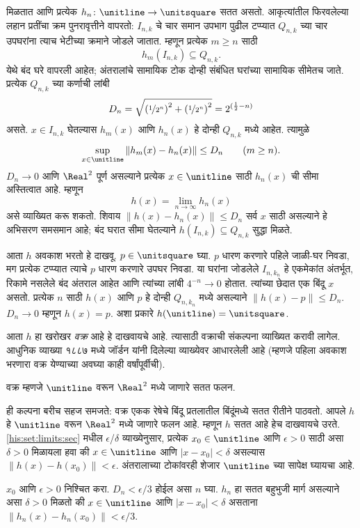 मिळतात आणि प्रत्येक $h_n\colon\unitline\to\unitsquare$
सतत असतो.
आकृत्यांतील फिरवलेल्या लहान प्रतींचा क्रम पुनरावृत्तीने
वापरतो: $I_{n,k}$ चे चार समान उपभाग पुढील टप्प्यात
$Q_{n,k}$ च्या चार उपघरांना त्याच भेटीच्या क्रमाने
जोडले जातात. म्हणून प्रत्येक $m\geq n$ साठी
\[
h_m(I_{n,k})\subseteq Q_{n,k}.
\]
येथे बंद घरे वापरली आहेत; अंतरालांचे सामायिक टोक दोन्ही
संबंधित घरांच्या सामायिक सीमेतच जाते.
प्रत्येक $Q_{n,k}$ च्या कर्णाची लांबी
\[
D_n=\sqrt{\left(\nicefrac{1}{2^{n}}\right)^2+
\left(\nicefrac{1}{2^{n}}\right)^2}
=2^{(\frac{1}{2}-n)}
\]
असते. $x\in I_{n,k}$ घेतल्यास $h_m(x)$ आणि $h_n(x)$
हे दोन्ही $Q_{n,k}$ मध्ये आहेत. त्यामुळे
\[
\sup_{x\in\unitline}\|h_m(x)-h_n(x)\|\leq D_n
\qquad(m\geq n).
\]
$D_n\to0$ आणि $\Real^2$ पूर्ण असल्याने प्रत्येक
$x\in\unitline$ साठी $h_n(x)$ ची सीमा अस्तित्वात आहे.
म्हणून
\[
h(x)=\lim_{n\to\infty}h_n(x)
\]
असे व्याख्यित करू शकतो. शिवाय
$\|h(x)-h_n(x)\|\leq D_n$ सर्व $x$ साठी असल्याने
हे अभिसरण समसमान आहे; बंद घरात सीमा घेतल्याने
$h(I_{n,k})\subseteq Q_{n,k}$ सुद्धा मिळते.

आता $h$ अवकाश भरतो हे दाखवू. $p\in\unitsquare$ घ्या.
$p$ धारण करणारे पहिले जाळी-घर निवडा, मग प्रत्येक
टप्प्यात त्याचे $p$ धारण करणारे उपघर निवडा. या
घरांना जोडलेले $I_{n,k_n}$ हे एकमेकांत अंतर्भूत,
रिकामे नसलेले बंद अंतराल आहेत आणि त्यांच्या लांबी
$4^{-n}\to0$ होतात. त्यांच्या छेदात एक बिंदू $x$
असतो. प्रत्येक $n$ साठी $h(x)$ आणि $p$ हे दोन्ही
$Q_{n,k_n}$ मध्ये असल्याने $\|h(x)-p\|\leq D_n$.
$D_n\to0$ म्हणून $h(x)=p$. अशा प्रकारे
$h(\unitline)=\unitsquare$.


आता $h$ हा खरोखर \emph{वक्र} आहे हे दाखवायचे आहे. त्यासाठी वक्राची संकल्पना व्याख्यित करावी लागेल. आधुनिक व्याख्या १८८७ मध्ये जॉर्डन यांनी दिलेल्या व्याख्येवर आधारलेली आहे (म्हणजे पहिला अवकाश भरणारा वक्र येण्याच्या अवघ्या काही वर्षांपूर्वीची).

\begin{defn}
वक्र म्हणजे $\unitline$ वरून $\Real^2$ मध्ये जाणारे सतत फलन.
\end{defn}

ही कल्पना बरीच सहज समजते: वक्र एकक रेषेचे बिंदू
प्रतलातील बिंदूंमध्ये सतत रीतीने पाठवतो. आपले $h$ हे
$\unitline$ वरून $\Real^2$ मध्ये जाणारे फलन आहे.
म्हणून $h$ सतत आहे हेच दाखवायचे उरते.
\ref{his:set:limits:sec} मधील $\epsilon$/$\delta$ व्याख्येनुसार,
प्रत्येक $x_0\in\unitline$ आणि $\epsilon>0$ साठी
असा $\delta>0$ मिळायला हवा की
$x\in\unitline$ आणि $|x-x_0|<\delta$ असल्यास
$\|h(x)-h(x_0)\|<\epsilon$.
अंतरालाच्या टोकांवरही शेजार $\unitline$ च्या सापेक्ष
घ्यायचा आहे.

$x_0$ आणि $\epsilon>0$ निश्चित करा.
$D_n<\epsilon/3$ होईल असा $n$ घ्या.
$h_n$ हा सतत बहुभुजी मार्ग असल्याने असा $\delta>0$
मिळतो की $x\in\unitline$ आणि $|x-x_0|<\delta$
असताना $\|h_n(x)-h_n(x_0)\|<\epsilon/3$.

